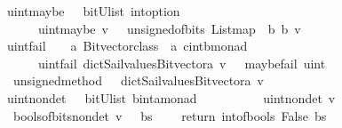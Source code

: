 \begin{isabellebody}
\endisadelimtheory
{}\isamarkupfalse%
\ uint{\isacharunderscore}maybe\ \ {\isacharcolon}{\isacharcolon}\ {\isachardoublequoteopen}{\isacharparenleft}bitU{\isacharparenright}list\ {\isasymRightarrow}{\isacharparenleft}int{\isacharparenright}option\ {\isachardoublequoteclose}\ \ \ \isanewline
\ \ \ \ \ {\isachardoublequoteopen}\ uint{\isacharunderscore}maybe\ v\ {\isacharequal}\ {\isacharparenleft}\ unsigned{\isacharunderscore}of{\isacharunderscore}bits\ {\isacharparenleft}List{\isachardot}map\ {\isacharparenleft}{\isasymlambda}\ b{\isachardot}\ b{\isacharparenright}\ v{\isacharparenright}{\isacharparenright}{\isachardoublequoteclose}\isanewline
\isanewline
{}\isamarkupfalse%
\ uint{\isacharunderscore}fail\ \ {\isacharcolon}{\isacharcolon}\ {\isachardoublequoteopen}\ {\isacharprime}a\ Bitvector{\isacharunderscore}class\ {\isasymRightarrow}\ {\isacharprime}a\ {\isasymRightarrow}{\isacharparenleft}{\isacharprime}c{\isacharcomma}{\isacharparenleft}int{\isacharparenright}{\isacharcomma}{\isacharprime}b{\isacharparenright}monad\ {\isachardoublequoteclose}\ \ \ \isanewline
\ \ \ \ \ {\isachardoublequoteopen}\ uint{\isacharunderscore}fail\ dict{\isacharunderscore}Sail{}{\isacharunderscore}values{\isacharunderscore}Bitvector{\isacharunderscore}a\ v\ {\isacharequal}\ {\isacharparenleft}\ maybe{\isacharunderscore}fail\ {\isacharparenleft}{\isacharprime}{\isacharprime}uint{\isacharprime}{\isacharprime}{\isacharparenright}\ {\isacharparenleft}\isanewline
\ \ {\isacharparenleft}unsigned{\isacharunderscore}method\ \ \ dict{\isacharunderscore}Sail{}{\isacharunderscore}values{\isacharunderscore}Bitvector{\isacharunderscore}a{\isacharparenright}\ v{\isacharparenright}{\isacharparenright}{\isachardoublequoteclose}\isanewline
\isanewline
{}\isamarkupfalse%
\ uint{\isacharunderscore}nondet\ \ {\isacharcolon}{\isacharcolon}\ {\isachardoublequoteopen}{\isacharparenleft}bitU{\isacharparenright}list\ {\isasymRightarrow}{\isacharparenleft}{\isacharprime}b{\isacharcomma}{\isacharparenleft}int{\isacharparenright}{\isacharcomma}{\isacharprime}a{\isacharparenright}monad\ {\isachardoublequoteclose}\ \ \ \isanewline
\ \ \ \ \ {\isachardoublequoteopen}\ uint{\isacharunderscore}nondet\ v\ {\isacharequal}\ {\isacharparenleft}\isanewline
\ \ bools{\isacharunderscore}of{\isacharunderscore}bits{\isacharunderscore}nondet\ v\ {\isasymbind}\ {\isacharparenleft}{\isasymlambda}\ bs\ {\isachardot}\ \isanewline
\ \ return\ {\isacharparenleft}int{\isacharunderscore}of{\isacharunderscore}bools\ False\ bs{\isacharparenright}{\isacharparenright}{\isacharparenright}{\isachardoublequoteclose}\isanewline

\end{isabellebody}
